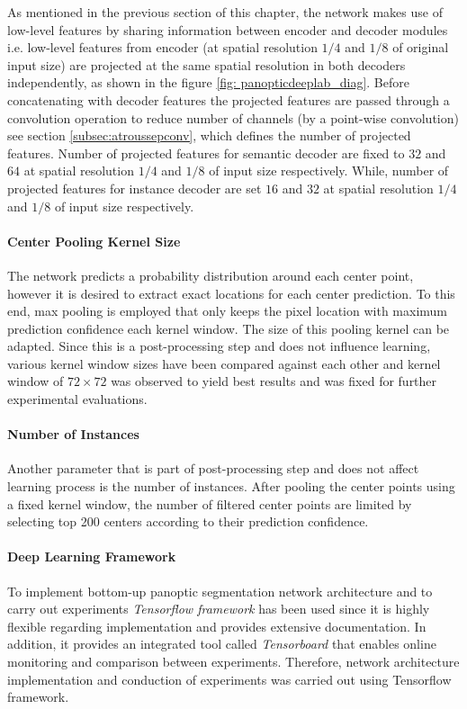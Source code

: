 As mentioned in the previous section of this chapter, the network makes use of low-level features by sharing information between encoder and decoder modules i.e. low-level features from encoder (at spatial resolution $1/4$ and $1/8$ of original input size) are projected at the same spatial resolution in both decoders independently, as shown in the figure \ref{fig: panopticdeeplab_diag}. Before concatenating with decoder features the projected features are passed through a convolution operation to reduce number of channels (by a point-wise convolution) see section \ref{subsec:atroussepconv}, which defines the number of projected features. Number of projected features for semantic decoder are fixed to $32$ and $64$ at spatial resolution $1/4$ and $1/8$ of input size respectively. While, number of projected features for instance decoder are set $16$ and $32$ at spatial resolution $1/4$ and $1/8$ of input size respectively.


\paragraph{Center Pooling Kernel Size}

The network predicts a probability distribution around each center point, however it is desired to extract exact locations for each center prediction. To this end, max pooling is employed that only keeps the pixel location with maximum prediction confidence each kernel window. The size of this pooling kernel can be adapted. Since this is a post-processing step and does not influence learning, various kernel window sizes have been compared against each other and kernel window of $72\times72$ was observed to yield best results and was fixed for further experimental evaluations.

\paragraph{Number of Instances}

Another parameter that is part of post-processing step and does not affect learning process is the number of instances. After pooling the center points using a fixed kernel window, the number of filtered center points are limited by selecting top 200 centers according to their prediction confidence. 

\paragraph{Deep Learning Framework}

To implement bottom-up panoptic segmentation network architecture and to carry out experiments \textit{Tensorflow framework} has been used since it is highly flexible regarding implementation and provides extensive documentation. In addition, it provides an integrated tool called \textit{Tensorboard} that enables online monitoring and comparison between experiments. Therefore, network architecture implementation and conduction of experiments was carried out using Tensorflow framework.  





